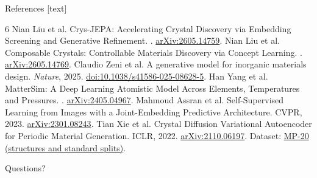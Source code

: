 \documentclass[10pt,aspectratio=169]{beamer}
\begin{document}
\begin{frame}{References}
\footnotesize
{}[text]
\begin{thebibliography}{6}
 Nian Liu et al.
\newblock Crys-JEPA: Accelerating Crystal Discovery via Embedding Screening and Generative Refinement.
. \href{https://arxiv.org/abs/2605.14759}{arXiv:2605.14759}.
 Nian Liu et al.
\newblock Composable Crystals: Controllable Materials Discovery via Concept Learning.
. \href{https://arxiv.org/abs/2605.14769}{arXiv:2605.14769}.
 Claudio Zeni et al.
\newblock A generative model for inorganic materials design.
\newblock \emph{Nature}, 2025. \href{https://doi.org/10.1038/s41586-025-08628-5}{doi:10.1038/s41586-025-08628-5}.
 Han Yang et al.
\newblock MatterSim: A Deep Learning Atomistic Model Across Elements, Temperatures and Pressures.
. \href{https://arxiv.org/abs/2405.04967}{arXiv:2405.04967}.
 Mahmoud Assran et al.
\newblock Self-Supervised Learning from Images with a Joint-Embedding Predictive Architecture.
\newblock CVPR, 2023. \href{https://arxiv.org/abs/2301.08243}{arXiv:2301.08243}.
 Tian Xie et al.
\newblock Crystal Diffusion Variational Autoencoder for Periodic Material Generation.
\newblock ICLR, 2022. \href{https://arxiv.org/abs/2110.06197}{arXiv:2110.06197}. Dataset: \href{https://github.com/txie-93/cdvae/tree/main/data/mp_20}{MP-20 (structures and standard splits)}.
\end{thebibliography}
\end{frame}

\begin{frame}
\centering\Huge\color{navy} Questions?
\end{frame}
\end{document}
